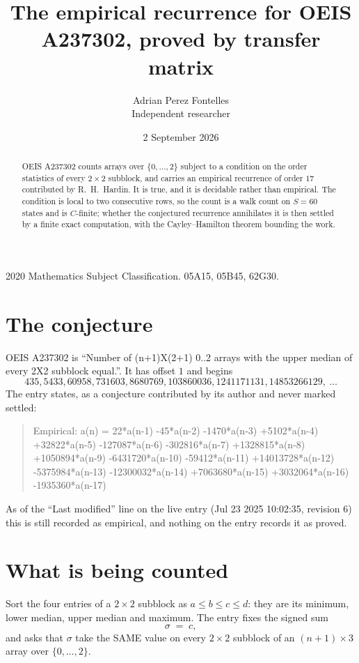 \documentclass[11pt,a4paper]{article}
\title{The empirical recurrence for OEIS A237302, proved by transfer matrix}
\author{Adrian Perez Fontelles\\ \small Independent researcher}
\date{2 September 2026}
\theoremstyle{plain}
\theoremstyle{definition}
\begin{document}
\maketitle

\begin{abstract}
OEIS A237302 counts arrays over $\{0,\dots,2\}$ subject to a condition on the order
statistics of every $2\times2$ subblock, and carries an empirical recurrence of order
$17$ contributed by R.~H.~Hardin. It is true, and it is decidable rather than empirical.
The condition is local to two consecutive rows, so the count is a walk count on $S=60$
states and is $C$-finite; whether the conjectured recurrence annihilates it is then settled by
a finite exact computation, with the Cayley--Hamilton theorem bounding the work.
\end{abstract}

\noindent\small 2020 Mathematics Subject Classification. 05A15, 05B45, 62G30.\normalsize

\section{The conjecture}

OEIS A237302 is ``Number of (n+1)X(2+1) 0..2 arrays with the upper median of every 2X2 subblock equal.''. It has offset $1$ and begins
\[
435, 5433, 60958, 731603, 8680769, 103860036, 1241171131, 14853266129,\ \dots
\]
The entry states, as a conjecture contributed by its author and never marked settled:
\begin{quote}
Empirical: a(n) = 22*a(n-1) -45*a(n-2) -1470*a(n-3) +5102*a(n-4) +32822*a(n-5) -127087*a(n-6) -302816*a(n-7) +1328815*a(n-8) +1050894*a(n-9) -6431720*a(n-10) -59412*a(n-11) +14013728*a(n-12) -5375984*a(n-13) -12300032*a(n-14) +7063680*a(n-15) +3032064*a(n-16) -1935360*a(n-17)
\end{quote}
As of the ``Last modified'' line on the live entry (Jul 23 2025 10:02:35, revision 6) this is still
recorded as empirical, and nothing on the entry records it as proved.

\section{What is being counted}

Sort the four entries of a $2\times2$ subblock as $a\le b\le c\le d$: they
are its minimum, lower median, upper median and maximum. The entry fixes the signed sum
\[
\sigma\;=\;c,
\]
and asks that $\sigma$ take the SAME value on every $2\times2$ subblock of an
$(n+1)\times3$ array over $\{0,\dots,2\}$.
\end{document}
